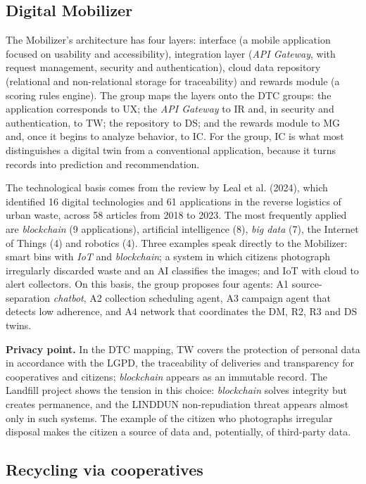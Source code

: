 \documentclass[12pt,a4paper,article,oneside,brazil,english]{abntex2}
\begin{document}
\subsection{Digital Mobilizer}

The Mobilizer's architecture has four layers: interface (a mobile application focused on usability and accessibility), integration layer (\textit{API Gateway}, with request management, security and authentication), cloud data repository (relational and non-relational storage for traceability) and rewards module (a scoring rules engine). The group maps the layers onto the DTC groups: the application corresponds to UX; the \textit{API Gateway} to IR and, in security and authentication, to TW; the repository to DS; and the rewards module to MG and, once it begins to analyze behavior, to IC. For the group, IC is what most distinguishes a digital twin from a conventional application, because it turns records into prediction and recommendation.

The technological basis comes from the review by Leal et al. (2024), which identified 16 digital technologies and 61 applications in the reverse logistics of urban waste, across 58 articles from 2018 to 2023. The most frequently applied are \textit{blockchain} (9 applications), artificial intelligence (8), \textit{big data} (7), the Internet of Things (4) and robotics (4). Three examples speak directly to the Mobilizer: smart bins with \textit{IoT} and \textit{blockchain}; a system in which citizens photograph irregularly discarded waste and an AI classifies the images; and IoT with cloud to alert collectors. On this basis, the group proposes four agents: A1 source-separation \textit{chatbot}, A2 collection scheduling agent, A3 campaign agent that detects low adherence, and A4 network that coordinates the DM, R2, R3 and DS twins.

\textbf{Privacy point.} In the DTC mapping, TW covers the protection of personal data in accordance with the LGPD, the traceability of deliveries and transparency for cooperatives and citizens; \textit{blockchain} appears as an immutable record. The Landfill project shows the tension in this choice: \textit{blockchain} solves integrity but creates permanence, and the LINDDUN non-repudiation threat appears almost only in such systems. The example of the citizen who photographs irregular disposal makes the citizen a source of data and, potentially, of third-party data.

\subsection{Recycling via cooperatives}
\end{document}
